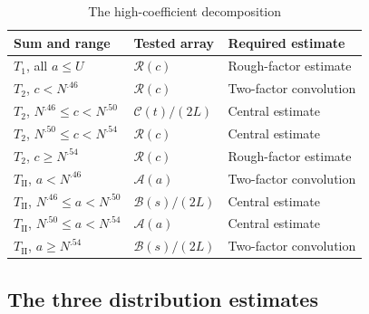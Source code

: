 \begin{table}[ht]
\caption{The high-coefficient decomposition}\label{tab:ra-rows}
\small
\begin{tabular}{@{}lll@{}}
\hline
Sum and range & Tested array & Required estimate\\
\hline
\(T_1\), all \(a\le U\) & \(\mathcal R(c)\) & Rough-factor estimate\\
\(T_2\), \(c<N^{.46}\) & \(\mathcal R(c)\) & Two-factor convolution\\
\(T_2\), \(N^{.46}\le c<N^{.50}\) & \(\mathcal C(t)/(2L)\) & Central estimate\\
\(T_2\), \(N^{.50}\le c<N^{.54}\) & \(\mathcal R(c)\) & Central estimate\\
\(T_2\), \(c\ge N^{.54}\) & \(\mathcal R(c)\) & Rough-factor estimate\\
\(T_{\mathrm{II}}\), \(a<N^{.46}\) & \(\mathcal A(a)\) & Two-factor convolution\\
\(T_{\mathrm{II}}\), \(N^{.46}\le a<N^{.50}\) & \(\mathcal B(s)/(2L)\) & Central estimate\\
\(T_{\mathrm{II}}\), \(N^{.50}\le a<N^{.54}\) & \(\mathcal A(a)\) & Central estimate\\
\(T_{\mathrm{II}}\), \(a\ge N^{.54}\) & \(\mathcal B(s)/(2L)\) & Two-factor convolution\\
\hline
\end{tabular}
\end{table}


\subsection{The three distribution estimates}

